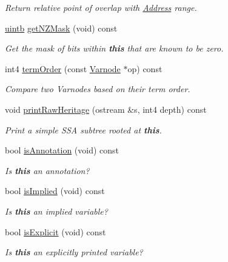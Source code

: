 \begin{DoxyCompactItemize}
\begin{DoxyCompactList}\small\item\em Return relative point of overlap with \mbox{\hyperlink{class_address}{Address}} range. \end{DoxyCompactList}\item 
\mbox{\hyperlink{types_8h_a2db313c5d32a12b01d26ac9b3bca178f}{uintb}} \mbox{\hyperlink{class_varnode_a27df81cbc8eab594f0eb4b07f444d037}{get\+N\+Z\+Mask}} (void) const
\begin{DoxyCompactList}\small\item\em Get the mask of bits within {\bfseries{this}} that are known to be zero. \end{DoxyCompactList}\item 
int4 \mbox{\hyperlink{class_varnode_a97a1df25894d4457f7442303381fc80a}{term\+Order}} (const \mbox{\hyperlink{class_varnode}{Varnode}} $\ast$op) const
\begin{DoxyCompactList}\small\item\em Compare two Varnodes based on their term order. \end{DoxyCompactList}\item 
void \mbox{\hyperlink{class_varnode_ae14d6bd40ea442939aecc888d7fcaa39}{print\+Raw\+Heritage}} (ostream \&s, int4 depth) const
\begin{DoxyCompactList}\small\item\em Print a simple S\+SA subtree rooted at {\bfseries{this}}. \end{DoxyCompactList}\item 
bool \mbox{\hyperlink{class_varnode_a8d1861b1e7c73802273da44c12a59b10}{is\+Annotation}} (void) const
\begin{DoxyCompactList}\small\item\em Is {\bfseries{this}} an annotation? \end{DoxyCompactList}\item 
bool \mbox{\hyperlink{class_varnode_a0e839165ea052660faee8b9222c6e910}{is\+Implied}} (void) const
\begin{DoxyCompactList}\small\item\em Is {\bfseries{this}} an implied variable? \end{DoxyCompactList}\item 
bool \mbox{\hyperlink{class_varnode_ae866a00302146a1f7d50352bdaa145d8}{is\+Explicit}} (void) const
\begin{DoxyCompactList}\small\item\em Is {\bfseries{this}} an explicitly printed variable? \end{DoxyCompactList}\item 

\end{DoxyCompactItemize}
